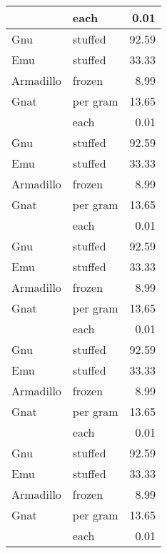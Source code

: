 {\begin{center}
\begin{xtabular}{llr}
\hline
{}          & each     & 0.01  \\
\hline
{}Gnu       & stuffed  & 92.59 \\
\hline
{}Emu       & stuffed  & 33.33 \\
\hline
{}Armadillo & frozen   & 8.99  \\
\hline
{}Gnat      & per gram & 13.65 \\
\hline
{}          & each     & 0.01  \\
\hline
{}Gnu       & stuffed  & 92.59 \\
\hline
{}Emu       & stuffed  & 33.33 \\
\hline
{}Armadillo & frozen   & 8.99  \\
\hline
{}Gnat      & per gram & 13.65 \\
\hline
{}          & each     & 0.01  \\
\hline
{}Gnu       & stuffed  & 92.59 \\
\hline
{}Emu       & stuffed  & 33.33 \\
\hline
{}Armadillo & frozen   & 8.99  \\
\hline
{}Gnat      & per gram & 13.65 \\
\hline
{}          & each     & 0.01  \\
\hline
{}Gnu       & stuffed  & 92.59 \\
\hline
{}Emu       & stuffed  & 33.33 \\
\hline
{}Armadillo & frozen   & 8.99  \\
\hline
{}Gnat      & per gram & 13.65 \\
\hline
{}          & each     & 0.01  \\
\hline
{}Gnu       & stuffed  & 92.59 \\
\hline
{}Emu       & stuffed  & 33.33 \\
\hline
{}Armadillo & frozen   & 8.99  \\
\hline
{}Gnat      & per gram & 13.65 \\
\hline
{}          & each     & 0.01  \\

\end{xtabular}
\end{center}}
